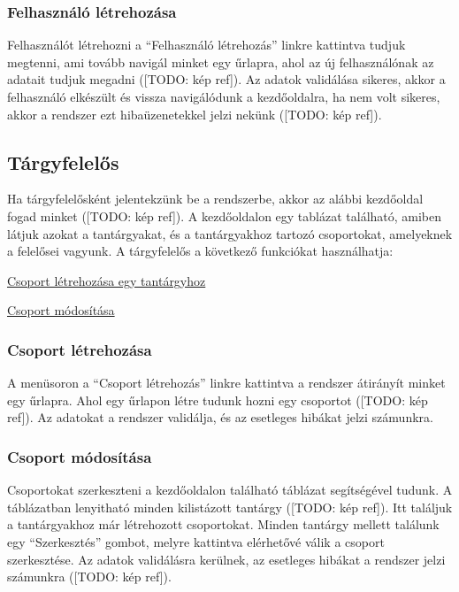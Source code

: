 \subsubsection{Felhasználó létrehozása}
Felhasználót létrehozni a ``Felhasználó létrehozás'' linkre kattintva tudjuk megtenni, ami tovább navigál minket egy űrlapra, ahol az új felhasználónak az adatait tudjuk megadni ([TODO: kép ref]). Az adatok validálása sikeres, akkor a felhasználó elkészült és vissza navigálódunk a kezdőoldalra, ha nem volt sikeres, akkor a rendszer ezt hibaüzenetekkel jelzi nekünk ([TODO: kép ref]).
\subsection{Tárgyfelelős}\label{step:teacher-role}
Ha tárgyfelelősként jelentekzünk be a rendszerbe, akkor az alábbi kezdőoldal fogad minket ([TODO: kép ref]).
A kezdőoldalon egy tablázat található, amiben látjuk azokat a tantárgyakat, és a tantárgyakhoz tartozó csoportokat, amelyeknek a felelősei vagyunk.
A tárgyfelelős a következő funkciókat használhatja:
\begin{compactitem}
    \item \hyperref[step:teacher-create-course]{Csoport létrehozása egy tantárgyhoz}
    \item \hyperref[step:teacher-create-course]{Csoport módosítása}
\end{compactitem}
\subsubsection{Csoport létrehozása}
\label{step:teacher-create-course}
A menüsoron a ``Csoport létrehozás'' linkre kattintva a rendszer átirányít minket egy űrlapra. Ahol egy űrlapon létre tudunk hozni egy csoportot ([TODO: kép ref]). Az adatokat a rendszer validálja, és az esetleges hibákat jelzi számunkra.
\subsubsection{Csoport módosítása}
\label{step:teacher-edit-course}
Csoportokat szerkeszteni a kezdőoldalon található táblázat segítségével tudunk. A táblázatban lenyitható minden kilistázott tantárgy ([TODO: kép ref]). Itt találjuk a tantárgyakhoz már létrehozott csoportokat. Minden tantárgy mellett találunk egy ``Szerkesztés'' gombot, melyre kattintva elérhetővé válik a csoport szerkesztése. Az adatok validálásra kerülnek, az esetleges hibákat a rendszer jelzi számunkra ([TODO: kép ref]).
